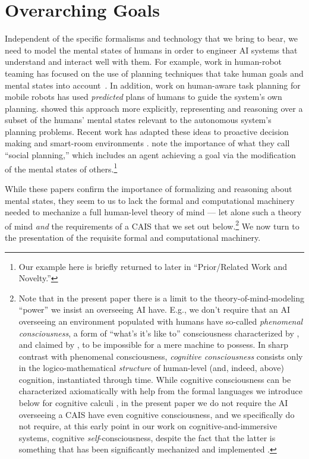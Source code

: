 \section{Overarching Goals}\label{ref:overarching_goals}

Independent of the specific formalisms and technology
that we bring to bear, we need to
model the mental states of humans in order to engineer AI
systems that understand and interact well with them.
For example, work in human-robot teaming has focused on
the use of planning techniques that take human goals and
mental states into account~\cite{briggs_multi-modal_2012}.
In addition, work on human-aware task planning for mobile robots
\cite{cirillo2009human} has used \emph{predicted} plans of humans to
guide the system's own planning.
\cite{talamadupula2014coordination,chakraborti2015planning} showed this
approach more explicitly, representing and reasoning over a subset
of the humans' mental states relevant to the autonomous system's planning
problems.
Recent work has adapted these ideas to proactive decision making
\cite{radar2017aaaifss,kim2017aaaifss} and smart-room environments
\cite{jones2017aaaifss}.  \cite{pearce_etal_social_planning_aaai2014}
note the importance of what they call ``social planning,'' which
includes an agent achieving a goal via the modification of the mental
states of others.\footnote{Our example here is briefly returned
to later in ``Prior/Related Work and Novelty.''}

While these papers confirm the importance of formalizing and reasoning
about mental states, they seem to us to lack the formal and
computational machinery needed to mechanize a full human-level theory
of mind --- let alone such a theory of mind \emph{and} the
requirements of a CAIS that we set out below.\footnote{Note that in
  the present paper there is a limit to the theory-of-mind-modeling
  ``power'' we insist an overseeing AI have.  E.g., we don't require
  that an AI overseeing an environment populated with humans have
  so-called \textit{phenomenal consciousness}, a form of ``what's it's
  like to'' consciousness characterized by \cite{bbs.block}, and
  claimed by \cite{sb_billion_conscious_robot}, to be impossible for a
  mere machine to possess.  In sharp contrast with phenomenal
  consciousness, \textit{cognitive consciousness} consists only in the
  logico-mathematical \emph{structure} of human-level (and, indeed,
  above) cognition, instantiated through time.  While cognitive
  consciousness can be characterized axiomatically with help from the
  formal languages we introduce below for cognitive calculi
  \cite{axiomatizing_consciousness1}, in the present paper we do not
  require the AI overseeing a CAIS have even cognitive consciousness,
  and we specifically do not require, at this early point in our work
  on cognitive-and-immersive systems, cognitive
  \emph{self}-consciousness, despite the fact that the latter is
  something that has been significantly mechanized and implemented
  \cite{roman2015_robot_self-con,sb_on_knowledge_game}.}  We now turn
to the presentation of the requisite formal and computational
machinery.
